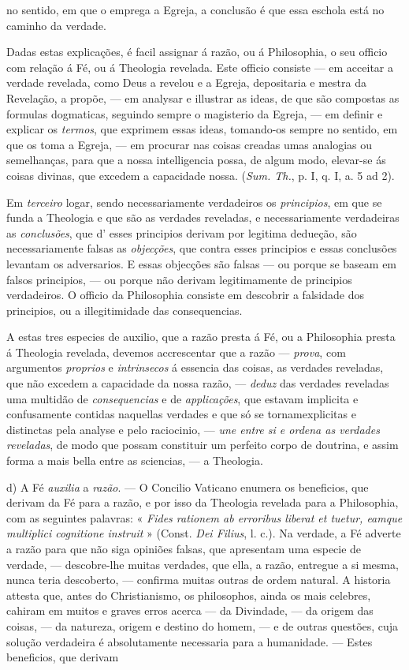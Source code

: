 no sentido, em que o emprega a Egreja, a conclusão é que essa eschola está no caminho da verdade.\par Dadas estas explicações, é facil assignar á razão, ou á Philosophia, o seu officio com relação á Fé, ou á Theologia revelada. Este officio consiste --- em acceitar a verdade revelada, como Deus a revelou e a Egreja, depositaria e mestra da Revelação, a propõe, --- em analysar e illustrar as ideas, de que são compostas as formulas dogmaticas, seguindo sempre o magisterio da Egreja, --- em definir e explicar os \emph{termos}, que exprimem essas ideas, tomando-os sempre no sentido, em que os toma a Egreja, --- em procurar nas coisas creadas umas analogias ou semelhanças, para que a nossa intelligencia possa, de algum modo, elevar-se ás coisas divinas, que excedem a capacidade nossa. (\emph{Sum. Th.}, p. I, q. I, a. 5 ad 2).\par Em \emph{terceiro} logar, sendo necessariamente verdadeiros os \emph{principios}, em que se funda a Theologia e que são as verdades reveladas, e necessariamente verdadeiras as \emph{conclusões}, que d' esses principios derivam por legitima dedueção, são necessariamente falsas as \emph{objecções}, que contra esses principios e essas conclusões levantam os adversarios. E essas objecções são falsas --- ou porque se baseam em falsos principios, --- ou porque não derivam legitimamente de principios verdadeiros. O officio da Philosophia consiste em descobrir a falsidade dos principios, ou a illegitimidade das consequencias.\par A estas tres especies de auxilio, que a razão presta á Fé, ou a Philosophia presta á Theologia revelada, devemos accrescentar que a razão --- \emph{prova}, com argumentos \emph{proprios} e \emph{intrinsecos} á essencia das coisas, as verdades reveladas, que não excedem a capacidade da nossa razão, --- \emph{deduz} das verdades reveladas uma multidão de \emph{consequencias} e de \emph{applicações}, que estavam implicita e confusamente contidas naquellas verdades e que só se tornamexplicitas e distinctas pela analyse e pelo raciocinio, --- \emph{une entre si e ordena as verdades reveladas}, de modo que possam constituir um perfeito corpo de doutrina, e assim forma a mais bella entre as sciencias, --- a Theologia.\par d) A Fé \emph{auxilia} a \emph{razão}. --- O Concilio Vaticano enumera os beneficios, que derivam da Fé para a razão, e por isso da Theologia revelada para a Philosophia, com as seguintes palavras: « \emph{Fides rationem ab erroribus liberat et tuetur, eamque multiplici cognitione instruit} » (Const. \emph{Dei Filius}, l. c.). Na verdade, a Fé adverte a razão para que não siga opiniões falsas, que apresentam uma especie de verdade, --- descobre-lhe muitas verdades, que ella, a razão, entregue a si mesma, nunca teria descoberto, --- confirma muitas outras de ordem natural. A historia attesta que, antes do Christianismo, os philosophos, ainda os mais celebres, cahiram em muitos e graves erros acerca --- da Divindade, --- da origem das coisas, --- da natureza, origem e destino do homem, --- e de outras questões, cuja solução verdadeira é absolutamente necessaria para a humanidade. --- Estes beneficios, que derivam 